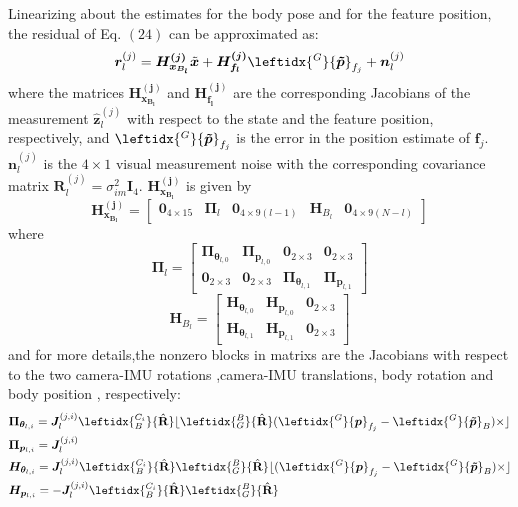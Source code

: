 \documentclass[a4paper, 10pt, conference]{ieeeconf}      %
\begin{document}
Linearizing about the estimates for the body pose and
for the feature position, the residual of Eq. $ (24) $ can be approximated as:
\begin{equation}
\bm {r}_l^{(j)} =\bm{H_{x_{B_l}}^{(j)}}{\tilde {\bm x}}+\bm{H_{f_{l}}^{(j)}}{\leftidx{^{G}}{\bm {\tilde p}}_{f_{j}}}+{\bm n_l^{(j)}}
\end{equation}
where the matrices $ \bm{H_{x_{B_l}}^{(j)}} $ and $ \bm{H_{f_{l}}^{(j)}} $ are the corresponding Jacobians of the measurement $  \bm {\hat z}_{l}^{(j)} $ with respect to the state and the
feature position, respectively, and $ {\leftidx{^{G}}{\bm {\tilde p}}_{f_{j}}} $ is the error in the
position estimate of $ \bm f_j $. $ \bm n_l^{(j)} $ is the $ 4 \times 1 $ visual measurement noise with the corresponding  covariance matrix  $ \bm R_l^{(j)} = {\sigma}_{im}^2 \bm I_4 $. $ \bm{H_{x_{B_l}}^{(j)}} $ is given by
\begin{equation}
 \bm{H_{x_{B_l}}^{(j)}}=\left[\begin{matrix} \bm 0_{4 \times 15} & \bm {\Pi}_l & \bm 0_{4 \times 9(l-1)} & \bm H_{B_l} & \bm 0_{4 \times 9(N-l)}
 \end{matrix} \right] 
\end{equation}
where
\begin{equation}
\bm {\Pi}_l =\left[\begin{matrix}
 \bm {\Pi}_{\bm {\theta}_{l,0}} & \bm {\Pi}_{\bm {p}_{l,0}} & \bm 0_{2 \times 3}  & \bm 0_{2 \times 3} \\ 
  \bm 0_{2 \times 3}  & \bm 0_{2 \times 3} & \bm {\Pi}_{\bm {\theta}_{l,1}} & \bm {\Pi}_{\bm {p}_{l,1}} 
\end{matrix} \right] 
\end{equation}
\begin{equation}
\bm H_{B_l} =\left[\begin{matrix}
 \bm {H}_{\bm {\theta}_{l,0}} & \bm {H}_{\bm {p}_{l,0}} & \bm 0_{2 \times 3}\\ 
  \bm {H}_{\bm {\theta}_{l,1}} & \bm {H}_{\bm {p}_{l,1}} & \bm 0_{2 \times 3}
\end{matrix} \right] 
\end{equation}
and for more details,the nonzero blocks in matrixs are  the Jacobians with respect to  the two camera-IMU rotations ,camera-IMU translations,  body rotation  and body position , respectively:
\begin{align}
&\bm {\Pi}_{\bm {\theta}_{l,i}} = \bm J_l^{(j,i)} \leftidx{_B^{C_i}}{\hat {\textbf R}}  \lfloor \leftidx{_G^B}{\hat {\textbf R}} (\leftidx{^{G}}{\bm { p}}_{f_{j}}-\leftidx{^{G}}{\bm {\tilde p}}_B)\times \rfloor \\ 
&\bm {\Pi}_{\bm {p}_{l,i}}  = \bm J_l^{(j,i)} \\
& \bm {H}_{\bm {\theta}_{l,i}}  = \bm J_l^{(j,i)}  \leftidx{_B^{C_i}}{\hat {\textbf R}} \leftidx{_G^B}{\hat {\textbf R}} \lfloor (\leftidx{^{G}}{\bm { p}}_{f_{j}}-\leftidx{^{G}}{\bm {\tilde p}}_B)\times \rfloor \\ 
& \bm {H}_{\bm {p}_{l,i}}  = -\bm J_l^{(j,i)} \leftidx{_B^{C_i}}{\hat {\textbf R}} \leftidx{_G^B}{\hat {\textbf R}}
\end{align}
\end{document}
